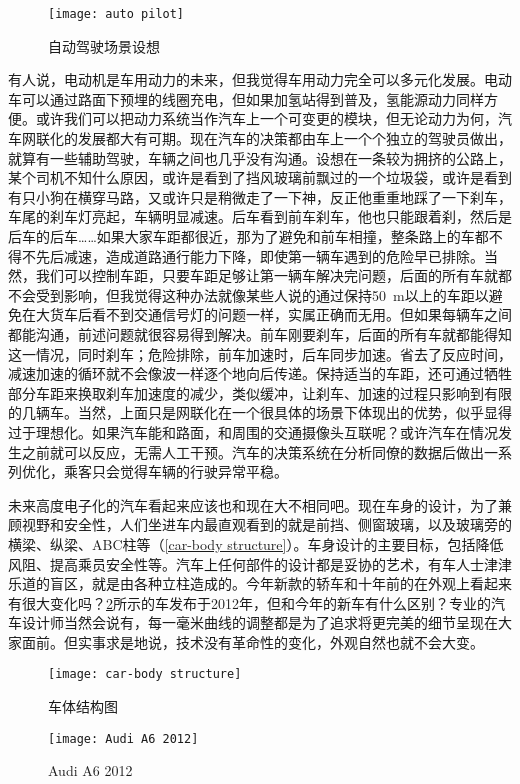 \documentclass[UTF8]{ctexart}
\numberwithin{figure}{section}
\numberwithin{table}{section}
\begin{document}
\begin{figure}[htbp]
	\centering
	\begin{minipage}[b]{0.6\textwidth}
		\centering
		\texttt{[image: auto pilot]}
		\caption{自动驾驶场景设想}
		\label{auto pilot}
	\end{minipage}
\end{figure}

有人说，电动机是车用动力的未来，但我觉得车用动力完全可以多元化发展。电动车可以通过路面下预埋的线圈充电，但如果加氢站得到普及，氢能源动力同样方便。或许我们可以把动力系统当作汽车上一个可变更的模块，但无论动力为何，汽车网联化的发展都大有可期。现在汽车的决策都由车上一个个独立的驾驶员做出，就算有一些辅助驾驶，车辆之间也几乎没有沟通。设想在一条较为拥挤的公路上，某个司机不知什么原因，或许是看到了挡风玻璃前飘过的一个垃圾袋，或许是看到有只小狗在横穿马路，又或许只是稍微走了一下神，反正他重重地踩了一下刹车，车尾的刹车灯亮起，车辆明显减速。后车看到前车刹车，他也只能跟着刹，然后是后车的后车……如果大家车距都很近，那为了避免和前车相撞，整条路上的车都不得不先后减速，造成道路通行能力下降，即使第一辆车遇到的危险早已排除。当然，我们可以控制车距，只要车距足够让第一辆车解决完问题，后面的所有车就都不会受到影响，但我觉得这种办法就像某些人说的通过保持\SI{50}{\meter}以上的车距以避免在大货车后看不到交通信号灯的问题一样，实属正确而无用。但如果每辆车之间都能沟通，前述问题就很容易得到解决。前车刚要刹车，后面的所有车就都能得知这一情况，同时刹车；危险排除，前车加速时，后车同步加速。省去了反应时间，减速加速的循环就不会像波一样逐个地向后传递。保持适当的车距，还可通过牺牲部分车距来换取刹车加速度的减少，类似缓冲，让刹车、加速的过程只影响到有限的几辆车。当然，上面只是网联化在一个很具体的场景下体现出的优势，似乎显得过于理想化。如果汽车能和路面，和周围的交通摄像头互联呢？或许汽车在情况发生之前就可以反应，无需人工干预。汽车的决策系统在分析同僚的数据后做出一系列优化，乘客只会觉得车辆的行驶异常平稳。

未来高度电子化的汽车看起来应该也和现在大不相同吧。现在车身的设计，为了兼顾视野和安全性，人们坐进车内最直观看到的就是前挡、侧窗玻璃，以及玻璃旁的横梁、纵梁、ABC柱等（\cref{car-body structure}）。车身设计的主要目标，包括降低风阻、提高乘员安全性等。汽车上任何部件的设计都是妥协的艺术，有车人士津津乐道的盲区，就是由各种立柱造成的。今年新款的轿车和十年前的在外观上看起来有很大变化吗？\cref{Audi A6 2012}所示的车发布于2012年，但和今年的新车有什么区别？专业的汽车设计师当然会说有，每一毫米曲线的调整都是为了追求将更完美的细节呈现在大家面前。但实事求是地说，技术没有革命性的变化，外观自然也就不会大变。

\begin{figure}[htbp]
	\centering
	\begin{minipage}[b]{0.45\textwidth}
		\centering
		\texttt{[image: car-body structure]}
		\caption{车体结构图}
		\label{car-body structure}
	\end{minipage}
	\begin{minipage}[b]{0.5\textwidth}
		\centering
		\texttt{[image: Audi A6 2012]}
		\caption{Audi A6 2012}
		\label{Audi A6 2012}
	\end{minipage}
\end{figure}
\end{document}
